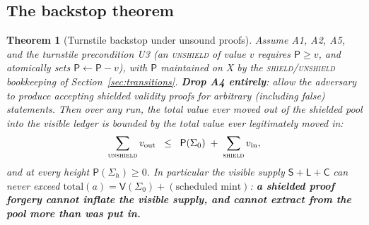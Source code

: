 \documentclass[11pt]{article}
\newtheorem{theorem}{Theorem}
\theoremstyle{definition}
\theoremstyle{remark}
\newcommand{\Val}{\mathsf{V}}
\newcommand{\spend}{\mathsf{S}}
\newcommand{\lock}{\mathsf{L}}
\newcommand{\commit}{\mathsf{C}}
\newcommand{\pool}{\mathsf{P}}
\newcommand{\total}{\mathrm{total}}
\begin{document}
\subsection{The backstop theorem}

\begin{theorem}[Turnstile backstop under unsound proofs]
\label{thm:backstop}
Assume A1, A2, A5, and the turnstile precondition U3 (an \textsc{unshield}
of value $v$ requires $\pool \ge v$, and atomically sets
$\pool\gets\pool-v$), with $\pool$ maintained on X by the
\textsc{shield}/\textsc{unshield} bookkeeping of Section~\ref{sec:transitions}.
\textbf{Drop A4 entirely}: allow the adversary to produce accepting
shielded validity proofs for arbitrary (including false) statements. Then
over any run, the total value ever moved out of the shielded pool into the
visible ledger is bounded by the total value ever legitimately moved in:
\[
  \sum_{\textsc{unshield}} v_{\text{out}}
  \;\;\le\;\;
  \pool(\Sigma_0) \;+\; \sum_{\textsc{shield}} v_{\text{in}},
\]
and at every height $\pool(\Sigma_h)\ge 0$. In particular the visible
supply $\spend+\lock+\commit$ can never exceed
$\total(a) = \Val(\Sigma_0) + (\text{scheduled mint})$: \textbf{a shielded
proof forgery cannot inflate the visible supply, and cannot extract from the
pool more than was put in.}
\end{theorem}
\end{document}
